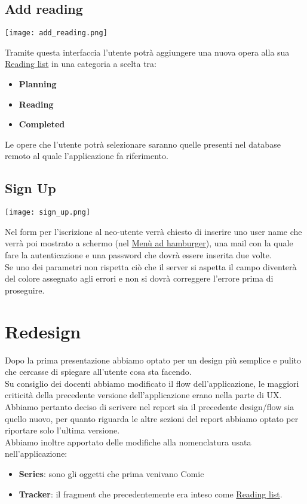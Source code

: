 \documentclass[../Assignment-3-LPSMT.tex]{subfiles}
\begin{document}
\subsection{Add reading}

\begin{center}
   \texttt{[image: add\_reading.png]}
\end{center}

Tramite questa interfaccia l'utente potrà aggiungere una nuova opera alla sua \hyperref[sec:reading_list]{Reading list} in una categoria a scelta tra:
\begin{itemize}
   \item \textbf{Planning}
   \item \textbf{Reading}
   \item \textbf{Completed}
\end{itemize}
Le opere che l'utente potrà selezionare saranno quelle presenti nel database remoto al quale l'applicazione fa riferimento.

\subsection{Sign Up}

\begin{center}
   \texttt{[image: sign\_up.png]}
\end{center}

Nel form per l'iscrizione al neo-utente verrà chiesto di inserire uno user name che verrà poi mostrato a schermo (nel \hyperref[sec:hamburger]{Menù ad hamburger}), una mail con la quale fare la autenticazione e una password che dovrà essere inserita due volte.\\
Se uno dei parametri non rispetta ciò che il server si aspetta il campo diventerà del colore assegnato agli errori e non si dovrà correggere l'errore prima di proseguire.

\section{Redesign}

Dopo la prima presentazione abbiamo optato per un design più semplice e pulito che cercasse di spiegare all'utente cosa sta facendo.\\
Su consiglio dei docenti abbiamo modificato il flow dell'applicazione, le maggiori criticità della precedente versione dell'applicazione erano nella parte di UX.\\
Abbiamo pertanto deciso di scrivere nel report  sia il precedente design/flow sia quello nuovo, per quanto riguarda le altre sezioni del report abbiamo optato per riportare solo l'ultima versione.\\
Abbiamo inoltre apportato delle modifiche alla nomenclatura usata nell'applicazione:
\begin{itemize}
  \item \textbf{Series}: sono gli oggetti che prima venivano Comic
  \item \textbf{Tracker}: il fragment che precedentemente era inteso come \hyperref[sec:reading_list]{Reading list}.
\end{itemize}
\end{document}
